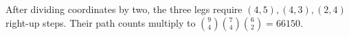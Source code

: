 After dividing coordinates by two, the three legs require $(4,5),(4,3),(2,4)$ right-up steps. Their path counts multiply to $\binom94\binom74\binom62=\boxed{66150}$.
